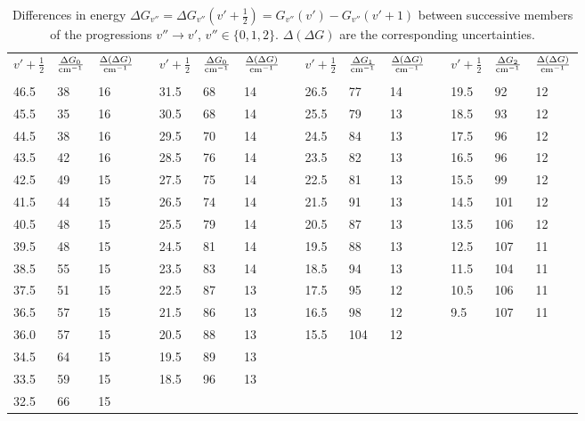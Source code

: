 \begin{table}[h]
\centering
\small
\begin{tabular}{|l |l |l ||c|
                 l |l |l ||c|
                 l |l |l ||c|
                 l |l |l |}
\cline{1-7}\cline{9-11}\cline{13-15}
$v' + \frac{1}{2}$ & $\frac{\Delta G_{0} }{ \mathrm{cm^{-1}}} $ & $\frac{\Delta (\Delta G) }{ \mathrm{cm^{-1}}} $&&
$v' + \frac{1}{2}$ & $\frac{\Delta G_{0} }{ \mathrm{cm^{-1}}} $ & $\frac{\Delta (\Delta G) }{ \mathrm{cm^{-1}}} $&&
$v' + \frac{1}{2}$ & $\frac{\Delta G_{1} }{ \mathrm{cm^{-1}}} $ & $\frac{\Delta (\Delta G) }{ \mathrm{cm^{-1}}} $&&
$v' + \frac{1}{2}$ & $\frac{\Delta G_{2} }{ \mathrm{cm^{-1}}} $ & $\frac{\Delta (\Delta G) }{ \mathrm{cm^{-1}}} $\\
&&&&&&&&&&&&&& \\\cline{1-7}\cline{9-11}\cline{13-15}
46.5 & 38 & 16 & & 31.5 & 68 & 14 & & 26.5 & 77 & 14 & & 19.5 & 92 & 12 \\ \cline{1-7}\cline{9-11}\cline{13-15}
45.5 & 35 & 16 & & 30.5 & 68 & 14 & & 25.5 & 79 & 13 & & 18.5 & 93 & 12 \\ \cline{1-7}\cline{9-11}\cline{13-15}
44.5 & 38 & 16 & & 29.5 & 70 & 14 & & 24.5 & 84 & 13 & & 17.5 & 96 & 12 \\ \cline{1-7}\cline{9-11}\cline{13-15}
43.5 & 42 & 16 & & 28.5 & 76 & 14 & & 23.5 & 82 & 13 & & 16.5 & 96 & 12 \\ \cline{1-7}\cline{9-11}\cline{13-15}
42.5 & 49 & 15 & & 27.5 & 75 & 14 & & 22.5 & 81 & 13 & & 15.5 & 99 & 12 \\ \cline{1-7}\cline{9-11}\cline{13-15}
41.5 & 44 & 15 & & 26.5 & 74 & 14 & & 21.5 & 91 & 13 & & 14.5 & 101 & 12 \\ \cline{1-7}\cline{9-11}\cline{13-15}
40.5 & 48 & 15 & & 25.5 & 79 & 14 & & 20.5 & 87 & 13 & & 13.5 & 106 & 12 \\ \cline{1-7}\cline{9-11}\cline{13-15}
39.5 & 48 & 15 & & 24.5 & 81 & 14 & & 19.5 & 88 & 13 & & 12.5 & 107 & 11 \\ \cline{1-7}\cline{9-11}\cline{13-15}
38.5 & 55 & 15 & & 23.5 & 83 & 14 & & 18.5 & 94 & 13 & & 11.5 & 104 & 11 \\ \cline{1-7}\cline{9-11}\cline{13-15}
37.5 & 51 & 15 & & 22.5 & 87 & 13 & & 17.5 & 95 & 12 & & 10.5 & 106 & 11 \\ \cline{1-7}\cline{9-11}\cline{13-15}
36.5 & 57 & 15 & & 21.5 & 86 & 13 & & 16.5 & 98 & 12 & & 9.5 & 107 & 11 \\ \cline{1-7}\cline{9-11}\cline{13-15}
36.0 & 57 & 15 & & 20.5 & 88 & 13 & & 15.5 & 104 & 12 \\ \cline{1-7}\cline{9-11}
34.5 & 64 & 15 & & 19.5 & 89 & 13 \\ \cline{1-7}
33.5 & 59 & 15 & & 18.5 & 96 & 13 \\ \cline{1-7}
32.5 & 66 & 15 \\ \cline{1-3}
\end{tabular}
\caption{Differences in energy 
$\Delta G_{v''} = \Delta G_{v''} (v' + \frac{1}{2}) = G_{v''}(v') - G_{v''}(v' + 1)$ 
between successive members of the progressions $v'' \rightarrow v'$, $v'' \in \{0, 1, 2\}$. 
$ \Delta (\Delta G) $ are the corresponding uncertainties. 
 }
\label{tab:dG}
\end{table}

